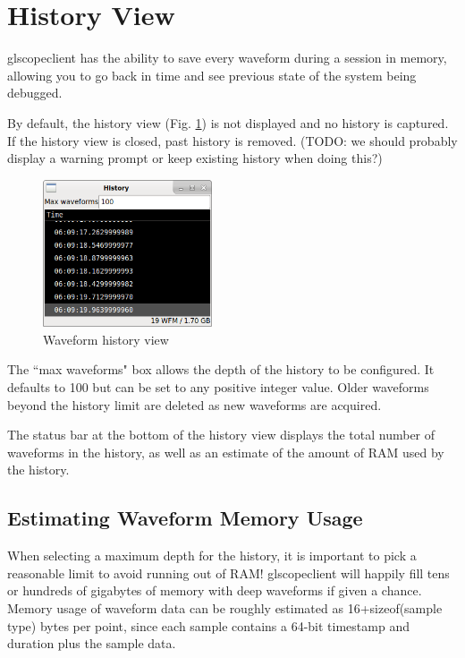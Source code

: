 \section{History View}
\label{sec:history}

glscopeclient has the ability to save every waveform during a session in memory, allowing you to go back in time and
see previous state of the system being debugged.

By default, the history view (Fig. \ref{historyview}) is not displayed and no history is captured. If the history view
is closed, past history is removed. (TODO: we should probably display a warning prompt or keep existing history when
doing this?)

\begin{figure}[H]
\centering
\includegraphics[width=5cm]{images/history-view.png}
\caption{Waveform history view}
\label{historyview}
\end{figure}

The ``max waveforms" box allows the depth of the history to be configured. It defaults to 100 but can be set to any
positive integer value. Older waveforms beyond the history limit are deleted as new waveforms are acquired.

The status bar at the bottom of the history view displays the total number of waveforms in the history, as well as an
estimate of the amount of RAM used by the history.

\subsection{Estimating Waveform Memory Usage}

When selecting a maximum depth for the history, it is important to pick a reasonable limit to avoid running out of RAM!
glscopeclient will happily fill tens or hundreds of gigabytes of memory with deep waveforms if given a chance. Memory
usage of waveform data can be roughly estimated as 16+sizeof(sample type) bytes per point, since each sample contains a
64-bit timestamp and duration plus the sample data.

